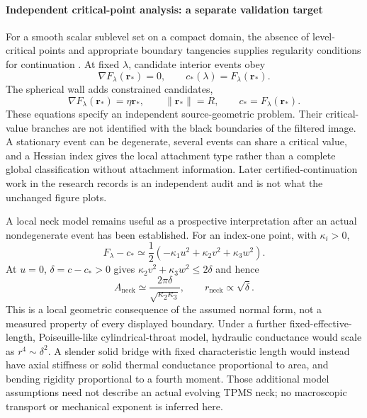 \paragraph{Independent critical-point analysis: a separate validation target}
For a smooth scalar sublevel set on a compact domain, the absence of level-critical points and appropriate boundary tangencies supplies regularity conditions for continuation \cite{kg_milnor1963morse}. At fixed $\lambda$, candidate interior events obey
\begin{equation}
\nabla F_\lambda(\mathbf r_*)=0,\qquad c_*(\lambda)=F_\lambda(\mathbf r_*).
\label{suppeq:tpms_morse_discriminant}
\end{equation}
The spherical wall adds constrained candidates,
\begin{equation}
\nabla F_\lambda(\mathbf r_*)=\eta\mathbf r_*,\qquad\|\mathbf r_*\|=R,\qquad c_*=F_\lambda(\mathbf r_*).
\label{suppeq:tpms_boundary_critical}
\end{equation}
These equations specify an independent source-geometric problem. Their critical-value branches are not identified with the black boundaries of the filtered image. A stationary event can be degenerate, several events can share a critical value, and a Hessian index gives the local attachment type rather than a complete global classification without attachment information. Later certified-continuation work in the research records is an independent audit and is not what the unchanged figure plots.

A local neck model remains useful as a prospective interpretation after an actual nondegenerate event has been established. For an index-one point, with $\kappa_i>0$,
\begin{equation}
F_\lambda-c_*\simeq\frac12\left(-\kappa_1u^2+\kappa_2v^2+\kappa_3w^2\right).
\label{suppeq:tpms_local_index_one}
\end{equation}
At $u=0$, $\delta=c-c_*>0$ gives $\kappa_2v^2+\kappa_3w^2\leq2\delta$ and hence
\begin{equation}
A_{\mathrm{neck}}\simeq\frac{2\pi\delta}{\sqrt{\kappa_2\kappa_3}},\qquad r_{\mathrm{neck}}\propto\sqrt\delta.
\label{suppeq:tpms_neck_scaling}
\end{equation}
This is a local geometric consequence of the assumed normal form, not a measured property of every displayed boundary. Under a further fixed-effective-length, Poiseuille-like cylindrical-throat model, hydraulic conductance would scale as $r^4\sim\delta^2$. A slender solid bridge with fixed characteristic length would instead have axial stiffness or solid thermal conductance proportional to area, and bending rigidity proportional to a fourth moment. Those additional model assumptions need not describe an actual evolving TPMS neck; no macroscopic transport or mechanical exponent is inferred here.

